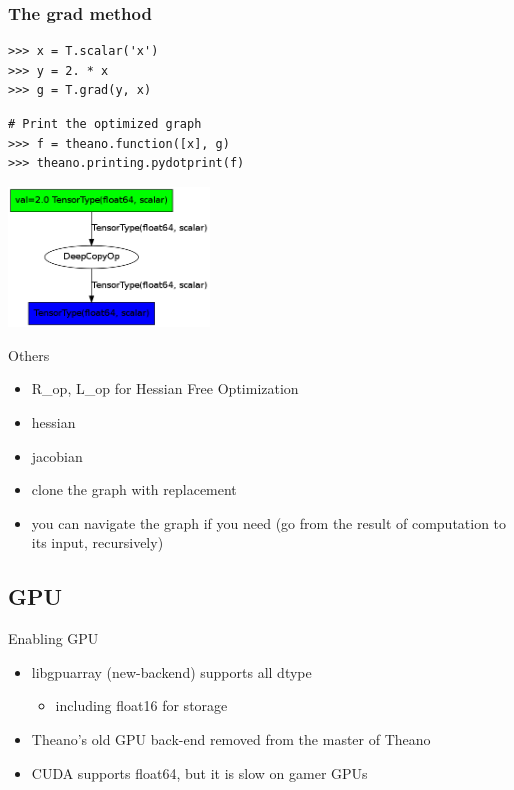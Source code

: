 \documentclass[utf8x,xcolor=pdftex,dvipsnames,table]{beamer}
\begin{document}
\begin{frame}[fragile]
  \frametitle{The grad method}
\begin{lstlisting}
>>> x = T.scalar('x')
>>> y = 2. * x
>>> g = T.grad(y, x)
\end{lstlisting}
\begin{lstlisting}
# Print the optimized graph
>>> f = theano.function([x], g)
>>> theano.printing.pydotprint(f)
\end{lstlisting}
\includegraphics[width=0.4\textwidth]{pics/theano_grad_opt.png}
\end{frame}

\begin{frame}{Others}
  \begin{itemize}
  \item R\_op, L\_op for Hessian Free Optimization
  \item hessian
  \item jacobian
  \item clone the graph with replacement
  \item you can navigate the graph if you need
      (go from the result of computation to its input, recursively)
  \end{itemize}
\end{frame}

\subsection{GPU}
\begin{frame}{Enabling GPU}
  \begin{itemize}
  \item libgpuarray (new-backend) supports all dtype
    \begin{itemize}
    \item including float16 for storage
    \end{itemize}
  \item Theano's old GPU back-end removed from the master of Theano
  \item CUDA supports float64, but it is slow on gamer GPUs
  \end{itemize}
\end{frame}
\end{document}
